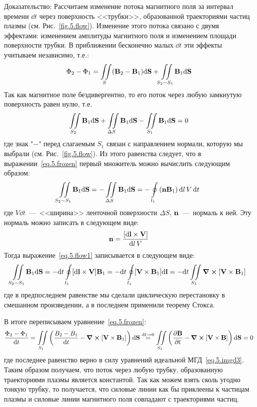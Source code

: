 \documentclass[10pt, a4paper]{article}
\numberwithin{equation}{section}
\begin{document}
Доказательство:
Рассчитаем изменение потока магнитного поля за интервал времени $\dd t$ через поверхность <<трубки>>, образованной траекториями частиц плазмы (см. Рис.~\ref{fig.5.flow}). Изменение этого потока связано с двумя эффектами: изменением амплитуды магнитного поля и изменением площади поверхности трубки. В приближении бесконечно малых $\dd t$ эти эффекты учитываем независимо, т.е.:
\begin{equation}
	\label{eq.5.frozen}
	\Phi_2 - \Phi_1 = \iint\limits_S (\vb{B}_2 - \vb{B}_1)\dd \vb{S} + \iint\limits_{S_2 - S_1}\vb{B}_1\dd\vb{S}
\end{equation}
Так как магнитное поле бездивергентно, то его поток через любую замкнутую поверхность равен нулю, т.е.
\begin{equation*}
	\iint\limits_{S_2}\vb{B}_1\dd\vb{S} + \iint\limits_{\Delta S}\vb{B}_1\dd\vb{S} - \iint\limits_{S_1}\vb{B}_1\dd\vb{S} = 0
\end{equation*}
где знак "$-$" перед слагаемым $S_1$ связан с направлением нормали, которую мы выбрали (см. Рис.~\ref{fig.5.flow}). Из этого равенства следует, что в выражении~\eqref{eq.5.frozen} первый множитель можно вычислить следующим образом:
\begin{equation}
	\label{eq.5.flow1}
	\iint\limits_{S_2 - S_1}\vb{B}_1\dd\vb{S} = -\iint\limits_{\Delta S} \vb{B}_1\dd\vb{S} = -\oint\limits_{l_1} \left( \vb{n}\vb{B}_1 \right) \dd l\,V\,\dd t
\end{equation}
где $V\dd t$~---~<<ширина>> ленточной поверхности $\Delta S$, $\vb{n}$~---~нормаль к ней. Эту нормаль можно записать в следующем виде:
\begin{equation*}
	\vb{n} = \frac{[\dd\vb{l}\times\vb{V}]}{\dd l\, V}
\end{equation*}
Тогда выражение~\eqref{eq.5.flow1} записывается в следующем виде:
\begin{equation*}
	\iint\limits_{S_2 - S_1}\vb{B}_1\dd\vb{S} = -\dd t \oint\limits_{l_1} [\dd\vb{l}\times\vb{V}]\vb{B}_1 = -\dd t \oint\limits_{l_1} [\vb{V}\times\vb{B}_1]\dd\vb{l} = -\dd t\iint\limits_{S_1}\curl[\vb{V}\times\vb{B}_1]
\end{equation*}
где в предпоследнем равенстве мы сделали циклическую перестановку в смешанном произведении, а в последнем применили теорему Стокса.

В итоге переписываем уравнение~\eqref{eq.5.frozen}:
\begin{equation*}
	\frac{\Phi_2 - \Phi_1}{\dd t} = \iint\limits_{S_1}\left( \frac{B_2 - B_1}{\dd t} - \curl[\vb{V}\times\vb{B}_1] \right)\dd\vb{S} \stackrel{\dd t\rightarrow 0}{=} \iint\limits_{S_1}\left( \pdv{\vb{B}}{t} - \curl[\vb{V}\times\vb{B}] \right)\dd\vb{S} = 0
\end{equation*}
где последнее равенство верно в силу уравнений идеальной МГД~\eqref{eq.5.imgd3}.
Таким образом получаем, что поток через любую трубку, образованную траекториями плазмы является константой. Так как можем взять сколь угодно тонкую трубку, то получается, что силовые линии как бы приклеены к частицам плазмы и силовые линии магнитного поля совпадают с траекториями частиц.
\end{document}
